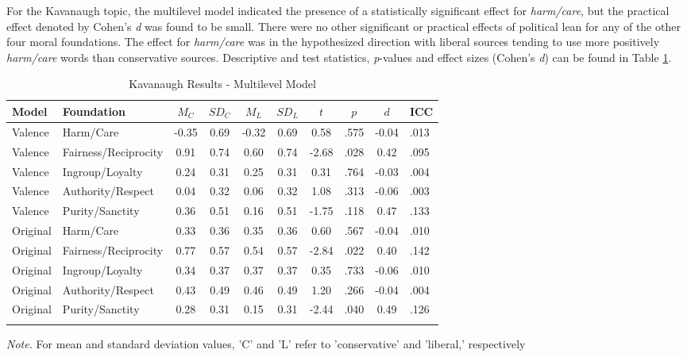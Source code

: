 \documentclass[
  man,floatsintext]{apa6}
\begin{document}
For the Kavanaugh topic, the multilevel model indicated the presence of
a statistically significant effect for \emph{harm/care}, but the practical
effect denoted by Cohen's \emph{d} was found to be small. There were no other
significant or practical effects of political lean for any of the other
four moral foundations. The effect for \emph{harm/care} was in the
hypothesized direction with liberal sources tending to use more
positively \emph{harm/care} words than conservative sources. Descriptive and
test statistics, \emph{p}-values and effect sizes (Cohen's \emph{d}) can be found
in Table \ref{tab:exp2-tablekav}.

\begin{table}[h]

\begin{center}
\begin{threeparttable}

\caption{\label{tab:exp2-tablekav}Kavanaugh Results - Multilevel Model}

\footnotesize{

\begin{tabular}{llcccccccl}
\toprule
Model & Foundation & $M_C$ & $SD_C$ & $M_L$ & $SD_L$ & $t$ & $p$ & $d$ & ICC\\
\midrule
Valence & Harm/Care & -0.35 & 0.69 & -0.32 & 0.69 & 0.58 & .575 & -0.04 & .013\\
Valence & Fairness/Reciprocity & 0.91 & 0.74 & 0.60 & 0.74 & -2.68 & .028 & 0.42 & .095\\
Valence & Ingroup/Loyalty & 0.24 & 0.31 & 0.25 & 0.31 & 0.31 & .764 & -0.03 & .004\\
Valence & Authority/Respect & 0.04 & 0.32 & 0.06 & 0.32 & 1.08 & .313 & -0.06 & .003\\
Valence & Purity/Sanctity & 0.36 & 0.51 & 0.16 & 0.51 & -1.75 & .118 & 0.47 & .133\\
Original & Harm/Care & 0.33 & 0.36 & 0.35 & 0.36 & 0.60 & .567 & -0.04 & .010\\
Original & Fairness/Reciprocity & 0.77 & 0.57 & 0.54 & 0.57 & -2.84 & .022 & 0.40 & .142\\
Original & Ingroup/Loyalty & 0.34 & 0.37 & 0.37 & 0.37 & 0.35 & .733 & -0.06 & .010\\
Original & Authority/Respect & 0.43 & 0.49 & 0.46 & 0.49 & 1.20 & .266 & -0.04 & .004\\
Original & Purity/Sanctity & 0.28 & 0.31 & 0.15 & 0.31 & -2.44 & .040 & 0.49 & .126\\
\bottomrule
\addlinespace
\end{tabular}

}

\begin{tablenotes}[para]
\normalsize{\textit{Note.} For mean and standard deviation values, 'C' and 'L' refer to 'conservative' and 'liberal,' respectively}
\end{tablenotes}

\end{threeparttable}
\end{center}

\end{table}
\end{document}
